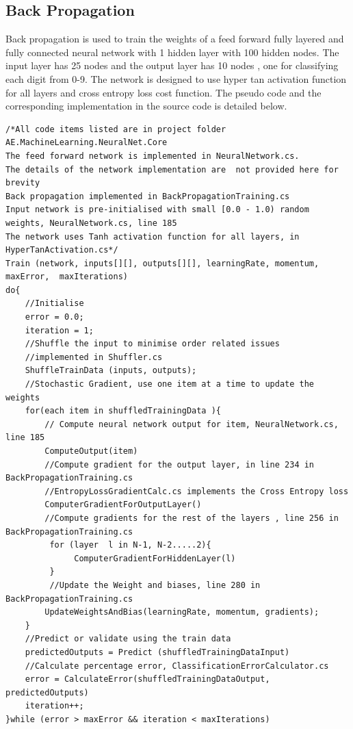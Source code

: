 \subsection{Back Propagation}
Back propagation is used to train the weights of a feed forward fully layered and fully connected neural network with 1 hidden layer with 100 hidden nodes. The input layer has 25 nodes  and the output layer has 10 nodes , one for classifying each digit from 0-9.   The network is designed to use hyper tan activation function for all layers and cross entropy loss cost function. The pseudo code and the corresponding implementation in the source code is detailed below.
\lstset{language=java, caption=Pseudo Code: Back Propagation, , label=code:BackPropagation}
\begin{lstlisting}
/*All code items listed are in project folder AE.MachineLearning.NeuralNet.Core
The feed forward network is implemented in NeuralNetwork.cs.
The details of the network implementation are  not provided here for brevity
Back propagation implemented in BackPropagationTraining.cs
Input network is pre-initialised with small [0.0 - 1.0) random weights, NeuralNetwork.cs, line 185
The network uses Tanh activation function for all layers, in HyperTanActivation.cs*/
Train (network, inputs[][], outputs[][], learningRate, momentum, maxError,  maxIterations)
do{
	//Initialise
	error = 0.0;
	iteration = 1;
	//Shuffle the input to minimise order related issues
	//implemented in Shuffler.cs
	ShuffleTrainData (inputs, outputs);	
	//Stochastic Gradient, use one item at a time to update the weights	
	for(each item in shuffledTrainingData ){	
		// Compute neural network output for item, NeuralNetwork.cs, line 185
		ComputeOutput(item)	
		//Compute gradient for the output layer, in line 234 in BackPropagationTraining.cs
		//EntropyLossGradientCalc.cs implements the Cross Entropy loss				
		ComputerGradientForOutputLayer()
		//Compute gradients for the rest of the layers , line 256 in BackPropagationTraining.cs
		 for (layer  l in N-1, N-2.....2){
		      ComputerGradientForHiddenLayer(l)
		 }		 
		 //Update the Weight and biases, line 280 in BackPropagationTraining.cs
		UpdateWeightsAndBias(learningRate, momentum, gradients);
	}		
	//Predict or validate using the train data
	predictedOutputs = Predict (shuffledTrainingDataInput)     
	//Calculate percentage error, ClassificationErrorCalculator.cs
	error = CalculateError(shuffledTrainingDataOutput, predictedOutputs)        
	iteration++;
}while (error > maxError && iteration < maxIterations)
\end{lstlisting}
	
